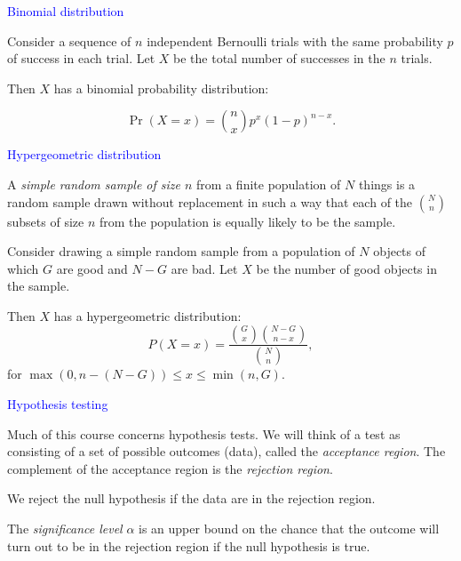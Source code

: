 \documentclass[landscape]{slides}
\newcommand{\beq}{\begin{equation}}
\newcommand{\eeq}{\end{equation}}
\begin{document}
\begin{slide}
{\textcolor{blue}{Binomial distribution}}

Consider a sequence of $n$ independent Bernoulli trials with the same probability $p$
of success in each trial. 
Let $X$ be the total number of successes in the $n$ trials. 

Then $X$ has a binomial probability distribution:

\beq
    \Pr(X=x) = {{n}\choose{x}} p^x (1-p)^{n-x}.
\eeq

\end{slide}

\begin{slide}
{\textcolor{blue}{Hypergeometric distribution}}

A {\em simple random sample of size $n$\/} from a finite population of $N$ things is a 
random sample drawn without replacement in such a way that each of the 
${{N}\choose{n}}$ subsets of size $n$ from the population is equally likely to be the sample. 

Consider drawing a simple random sample from a population of $N$ objects of which 
$G$ are good and $N-G$ are bad. 
Let $X$ be the number of good objects in the sample.

Then $X$ has a hypergeometric distribution:
\beq
   P(X=x) = \frac{{{G}\choose{x}} {{N-G}\choose{n-x}}}{{{N}\choose{n}}},
\eeq
for $\max(0, n-(N-G)) \le x \le  \min(n, G)$.

\end{slide}

\begin{slide}
{\textcolor{blue}{Hypothesis testing}}

Much of this course concerns hypothesis tests.  
We will think of a test as consisting of a set of possible outcomes (data), called
the {\em acceptance region\/}.
The complement of the acceptance region is the {\em rejection region\/}.

We reject the null hypothesis if the data are in the rejection region.

The {\em significance level\/} $\alpha$ is an upper bound on the 
chance that the outcome will turn out to be in the rejection region 
if the null hypothesis is true.

\end{slide}
\end{document}
